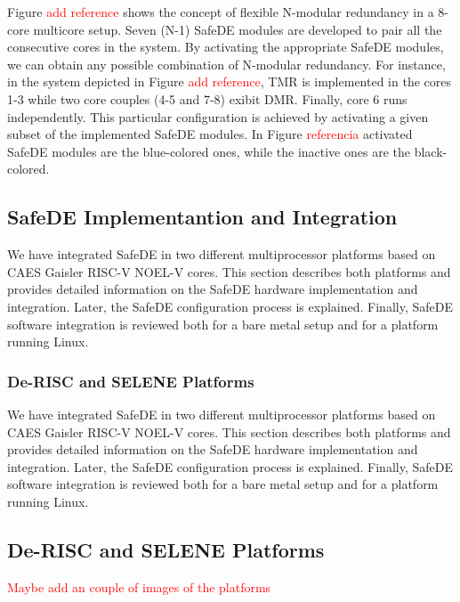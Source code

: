 Figure \textcolor{red}{add reference} shows the concept of flexible N-modular redundancy in a 8-core multicore setup. Seven (N-1) SafeDE modules are developed to pair all the consecutive cores in the system. By activating the appropriate SafeDE modules, we can obtain any possible combination of N-modular redundancy. For instance, in the system depicted in Figure \textcolor{red}{add reference}, TMR is implemented in the cores 1-3 while two core couples (4-5 and 7-8) exibit DMR. Finally, core 6 runs independently. This particular configuration is achieved by activating a given subset of the implemented SafeDE modules. In Figure \textcolor{red}{referencia} activated SafeDE modules are the blue-colored ones, while the inactive ones are the black-colored.

\bigskip



\subsection{SafeDE Implementantion and Integration}

We have integrated SafeDE in two different multiprocessor platforms based on CAES Gaisler RISC-V NOEL-V cores. This section describes both platforms and provides detailed information on the SafeDE hardware implementation and integration. Later, the SafeDE configuration process is explained. Finally, SafeDE software integration is reviewed both for a bare metal setup and for a platform running Linux.    

\bigskip


\subsubsection{De-RISC and SELENE Platforms}
We have integrated SafeDE in two different multiprocessor platforms based on CAES Gaisler RISC-V NOEL-V cores. This section describes both platforms and provides detailed information on the SafeDE hardware implementation and integration. Later, the SafeDE configuration process is explained. Finally, SafeDE software integration is reviewed both for a bare metal setup and for a platform running Linux.    

\subsection{De-RISC and SELENE Platforms}
\textcolor{red}{Maybe add an couple of images of the platforms}


